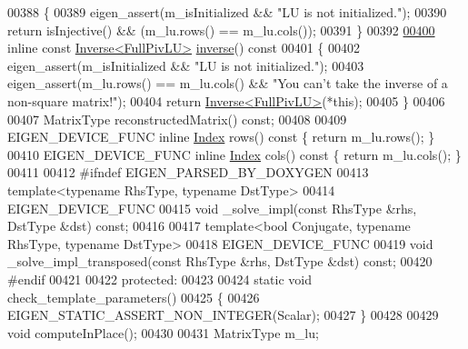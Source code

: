 \begin{DoxyCode}
00388 \textcolor{keyword}{    }\{
00389       eigen\_assert(m\_isInitialized && \textcolor{stringliteral}{"LU is not initialized."});
00390       \textcolor{keywordflow}{return} isInjective() && (m\_lu.rows() == m\_lu.cols());
00391     \}
00392 
\hyperlink{group___l_u___module_ae6f4bb55f859f6353f99cf15ecff4b25}{00400}     \textcolor{keyword}{inline} \textcolor{keyword}{const} \hyperlink{class_eigen_1_1_inverse}{Inverse<FullPivLU>} \hyperlink{group___l_u___module_ae6f4bb55f859f6353f99cf15ecff4b25}{inverse}()\textcolor{keyword}{ const}
00401 \textcolor{keyword}{    }\{
00402       eigen\_assert(m\_isInitialized && \textcolor{stringliteral}{"LU is not initialized."});
00403       eigen\_assert(m\_lu.rows() == m\_lu.cols() && \textcolor{stringliteral}{"You can't take the inverse of a non-square matrix!"});
00404       \textcolor{keywordflow}{return} \hyperlink{class_eigen_1_1_inverse}{Inverse<FullPivLU>}(*this);
00405     \}
00406 
00407     MatrixType reconstructedMatrix() \textcolor{keyword}{const};
00408 
00409     EIGEN\_DEVICE\_FUNC \textcolor{keyword}{inline} \hyperlink{group___core___module_a554f30542cc2316add4b1ea0a492ff02}{Index} rows()\textcolor{keyword}{ const }\{ \textcolor{keywordflow}{return} m\_lu.rows(); \}
00410     EIGEN\_DEVICE\_FUNC \textcolor{keyword}{inline} \hyperlink{group___core___module_a554f30542cc2316add4b1ea0a492ff02}{Index} cols()\textcolor{keyword}{ const }\{ \textcolor{keywordflow}{return} m\_lu.cols(); \}
00411 
00412 \textcolor{preprocessor}{    #ifndef EIGEN\_PARSED\_BY\_DOXYGEN}
00413     \textcolor{keyword}{template}<\textcolor{keyword}{typename} RhsType, \textcolor{keyword}{typename} DstType>
00414     EIGEN\_DEVICE\_FUNC
00415     \textcolor{keywordtype}{void} \_solve\_impl(\textcolor{keyword}{const} RhsType &rhs, DstType &dst) \textcolor{keyword}{const};
00416 
00417     \textcolor{keyword}{template}<\textcolor{keywordtype}{bool} Conjugate, \textcolor{keyword}{typename} RhsType, \textcolor{keyword}{typename} DstType>
00418     EIGEN\_DEVICE\_FUNC
00419     \textcolor{keywordtype}{void} \_solve\_impl\_transposed(\textcolor{keyword}{const} RhsType &rhs, DstType &dst) \textcolor{keyword}{const};
00420 \textcolor{preprocessor}{    #endif}
00421 
00422   \textcolor{keyword}{protected}:
00423 
00424     \textcolor{keyword}{static} \textcolor{keywordtype}{void} check\_template\_parameters()
00425     \{
00426       EIGEN\_STATIC\_ASSERT\_NON\_INTEGER(Scalar);
00427     \}
00428 
00429     \textcolor{keywordtype}{void} computeInPlace();
00430 
00431     MatrixType m\_lu;

\end{DoxyCode}
